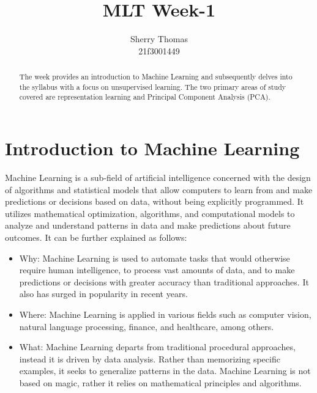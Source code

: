 \documentclass[letterpaper,11pt]{article}
\title{MLT Week-1}
\author{Sherry Thomas \\ 21f3001449}
\begin{document}
\maketitle
\tableofcontents

\begin{abstract}
The week provides an introduction to Machine Learning and subsequently delves into the syllabus with a focus on unsupervised learning. The two primary areas of study covered are representation learning and Principal Component Analysis (PCA).
\end{abstract}

\section{Introduction to Machine Learning}
Machine Learning is a sub-field of artificial intelligence concerned with the design of algorithms and statistical models that allow computers to learn from and make predictions or decisions based on data, without being explicitly programmed. It utilizes mathematical optimization, algorithms, and computational models to analyze and understand patterns in data and make predictions about future outcomes.
\newpage
It can be further explained as follows:
\begin{itemize}
    \item Why: Machine Learning is used to automate tasks that would otherwise require human intelligence, to process vast amounts of data, and to make predictions or decisions with greater accuracy than traditional approaches. It also has surged in popularity in recent years.
    \item Where: Machine Learning is applied in various fields such as computer vision, natural language processing, finance, and healthcare, among others.
    \item What: Machine Learning departs from traditional procedural approaches, instead it is driven by data analysis. Rather than memorizing specific examples, it seeks to generalize patterns in the data. Machine Learning is not based on magic, rather it relies on mathematical principles and algorithms.
\end{itemize}
\end{document}
